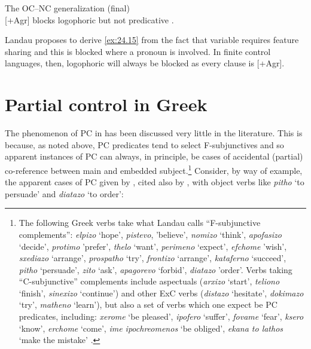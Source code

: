 \documentclass[output=paper]{langsci/langscibook}
\begin{document}
\ea\label{ex:24.15} The \gls{OC}--NC generalization (final)\\
    {}[+Agr] blocks logophoric  but not predicative .
\z

Landau proposes to derive \eqref{ex:24.15} from the fact that variable  requires
feature sharing and this is blocked where a pronoun is involved. In finite
control languages, then, logophoric  will always be blocked as every
clause is [+Agr].

\section{Partial control in Greek}\label{sec:24.3}

The phenomenon of \gls{PC} in  has been
discussed very little in the literature. This is because, as noted above,
\gls{PC} predicates tend to select F-subjunctives
and so apparent instances of \gls{PC} can always, in
principle, be cases of accidental (partial) co-reference between main and
embedded subject.\footnote{The following Greek verbs take what Landau calls
    \enquote{F-subjunctive complements}: \emph{elpizo} `hope',
    \emph{pistevo}, 'believe', \emph{nomizo} `think', \emph{apofasizo}
    `decide', \emph{protimo} 'prefer', \emph{thelo} `want', \emph{perimeno}
    `expect', \emph{efchome} 'wish', \emph{sxediazo} `arrange',
    \emph{prospatho} `try', \emph{frontizo} `arrange', \emph{kataferno}
    `succeed', \emph{pitho} `persuade', \emph{zito} `ask', \emph{apagorevo}
    `forbid', \emph{diatazo} 'order'. Verbs taking \enquote{C-subjunctive}
    complements include aspectuals (\emph{arxizo} `start', \emph{teliono}
    `finish', \emph{sinexizo} `continue') and other
    \gls{ExC} verbs (\emph{distazo} `hesitate',
    \emph{dokimazo} `try', \emph{matheno} `learn'), but also a set of verbs
    which one expect be \gls{PC} predicates,
    including: \emph{xerome} `be pleased', \emph{ipofero} `suffer',
    \emph{fovame} `fear', \emph{ksero} `know', \emph{erchome} `come', \emph{ime
ipochreomenos} `be obliged', \emph{ekana to lathos} `make the mistake'
\parencite[Ch.\ 4]{Varlokosta1994}.\label{fn:24.4}} Consider, by way of
example, the apparent cases of \gls{PC} given by
\textcite{Spyropoulos2007b}, cited also by \textcite{Kapetangianni2010}, with
object  verbs like \emph{pitho} `to persuade' and \emph{diatazo} `to
order':
\end{document}
